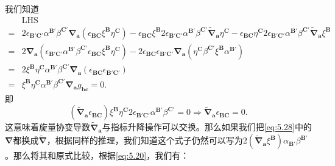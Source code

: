 我们知道
\begin{equation*}
	\begin{aligned}
		& \mathrm{LHS}\\
		= & 2\epsilon _{\boldsymbol{B} '\boldsymbol{C} '} \alpha ^{\boldsymbol{B} '} \beta ^{\boldsymbol{C} '}\boldsymbol{\nabla }_{\boldsymbol{a}} (\epsilon _{\boldsymbol{BC}} \xi ^{\boldsymbol{B}} \eta ^{\boldsymbol{C}} )-\epsilon _{\boldsymbol{BC}} \xi ^{\boldsymbol{B}} 2\epsilon _{\boldsymbol{B} '\boldsymbol{C} '} \alpha ^{\boldsymbol{B} '} \beta ^{\boldsymbol{C} '}\tilde{\boldsymbol{\nabla }}_{\boldsymbol{a}} \eta ^{\boldsymbol{C}} -\epsilon _{\boldsymbol{BC}} \eta ^{\boldsymbol{C}} 2\epsilon _{\boldsymbol{B} '\boldsymbol{C} '} \alpha ^{\boldsymbol{B} '} \beta ^{\boldsymbol{C} '}\tilde{\boldsymbol{\nabla }}_{\boldsymbol{a}} \xi ^{\boldsymbol{B}}\\
		= & 2\boldsymbol{\nabla }_{\boldsymbol{a}} (\epsilon _{\boldsymbol{B} '\boldsymbol{C} '} \alpha ^{\boldsymbol{B} '} \beta ^{\boldsymbol{C} '} \epsilon _{\boldsymbol{BC}} \xi ^{\boldsymbol{B}} \eta ^{\boldsymbol{C}} )-2\epsilon _{\boldsymbol{BC}} \epsilon _{\boldsymbol{B} '\boldsymbol{C} '}\boldsymbol{\nabla }_{\boldsymbol{a}} (\eta ^{\boldsymbol{C}} \beta ^{\boldsymbol{C} '} \xi ^{\boldsymbol{B}} \alpha ^{\boldsymbol{B} '} )\\
		= & 2\xi ^{\boldsymbol{B}} \eta ^{\boldsymbol{C}} \alpha ^{\boldsymbol{B} '} \beta ^{\boldsymbol{C} '}\boldsymbol{\nabla }_{\boldsymbol{a}} (\epsilon _{\boldsymbol{BC}} \epsilon _{\boldsymbol{B} '\boldsymbol{C} '} )\\
		= & \xi ^{\boldsymbol{B}} \eta ^{\boldsymbol{C}} \alpha ^{\boldsymbol{B} '} \beta ^{\boldsymbol{C} '}\boldsymbol{\nabla }_{\boldsymbol{a}} g_{\boldsymbol{bc}} =0\text{. }
	\end{aligned}
\end{equation*}
即
\begin{equation*}
	(\tilde{\boldsymbol{\nabla }}_{\boldsymbol{a}} \epsilon _{\boldsymbol{BC}} )\xi ^{\boldsymbol{B}} \eta ^{\boldsymbol{C}} 2\epsilon _{\boldsymbol{B} '\boldsymbol{C} '} \alpha ^{\boldsymbol{B} '} \beta ^{\boldsymbol{C} '} =0\Rightarrow \tilde{\boldsymbol{\nabla }}_{\boldsymbol{a}} \epsilon _{\boldsymbol{BC}} =0.
\end{equation*}
这意味着旋量协变导数$\tilde{\boldsymbol{\nabla }}_{\boldsymbol{a}}$与指标升降操作可以交换。那么如果我们把\ref{eq:5.28}中的$\boldsymbol{\nabla }$都换成$\tilde{\boldsymbol{\nabla }}$，根据同样的推理，我们知道这个式子仍然可以写为$2(\tilde{\boldsymbol{\nabla }}_{\boldsymbol{a}} \xi ^{\boldsymbol{B}} )\alpha _{\boldsymbol{B} '} \beta ^{\boldsymbol{B} '}$。那么将其和原式比较，根据\ref{eq:5.20}，我们有：
